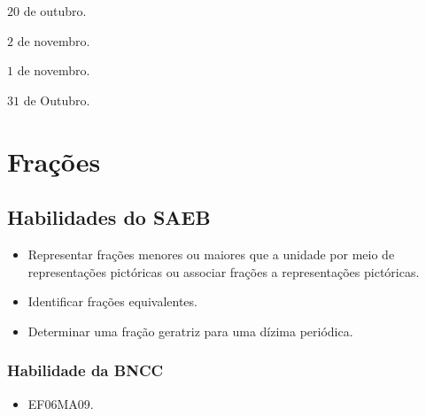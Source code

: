 \begin{escolha}
\item $20$ de outubro.
\item $2$ de novembro.
\item $1$ de novembro.
\item $31$ de Outubro.
\end{escolha}



\chapter{Frações}

\vspace*{-1cm}
\enlargethispage{2\baselineskip}

\section*{Habilidades do SAEB}
\begin{itemize}
\item Representar frações menores ou maiores que a
unidade por meio de representações pictóricas ou associar frações a
representações pictóricas.
\item
  Identificar frações equivalentes.
\item
  Determinar uma fração geratriz para uma dízima periódica.
\end{itemize}

\subsection{Habilidade da BNCC} 
\begin{itemize}
\item EF06MA09.
\end{itemize}

